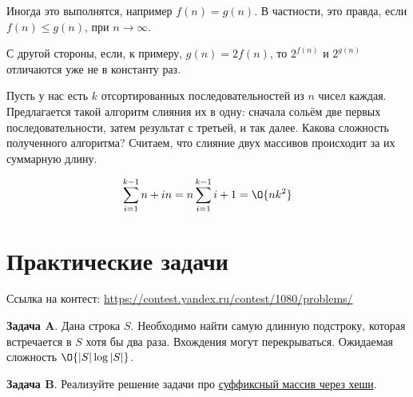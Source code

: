 \documentclass[addpoints]{exam}
\begin{document}
\begin{questions}
\begin{solution}
Иногда это выполнятся, например $f(n) = g(n)$. В частности, это правда, если $f(n) \leqslant g(n)$, при $n \to \infty$.

С другой стороны, если, к примеру, $g(n) = 2f(n)$, то $2^{f(n)}$ и $2^{g(n)}$ отличаются уже не в константу раз.

\end{solution}

\question[\half] Пусть у нас есть $k$ отсортированных последовательностей из $n$ чисел каждая. Предлагается такой алгоритм слияния их в одну: сначала сольём две первых последовательности, затем результат с третьей, и так далее. Какова сложность полученного алгоритма? Считаем, что слияние двух массивов происходит за их суммарную длину.

\begin{solution}

$$\sum\limits_{i=1}^{k-1} {n + in} = n \sum\limits_{i=1}^{k-1} {i + 1} = \O{n k^2}$$

\end{solution}


\section{Практические задачи}

Ссылка на контест: \url{https://contest.yandex.ru/contest/1080/problems/}

\question[1] \textbf{Задача A}. Дана строка $S$. Необходимо найти самую длинную подстроку, которая встречается в $S$ хотя бы два раза. Вхождения могут перекрываться. Ожидаемая сложность $\O{|S| \log{|S|}}$. 

\question[1] \textbf{Задача B}. Реализуйте решение задачи про \hyperref[sufarray]{суффиксный массив через хеши}. 

\end{questions}


\begin{center}
\pointtable[h][questions]
\end{center}
\end{document}
